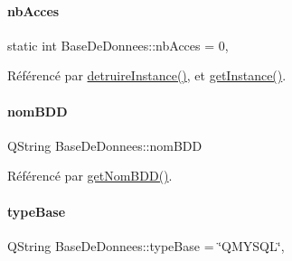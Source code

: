 \mbox{\label{class_base_de_donnees_a5d2e5264c826c6600fd20a9831fd1782}} 
\paragraph{\texorpdfstring{nb\+Acces}{nbAcces}}
{\footnotesize\ttfamily static int Base\+De\+Donnees\+::nb\+Acces = 0\hspace{0.3cm}{\ttfamily [static]}, {\ttfamily [private]}}



Référencé par \hyperlink{class_base_de_donnees_a457401c0816b888c77ce915997545f4e}{detruire\+Instance()}, et \hyperlink{class_base_de_donnees_a80028aa2b6b4fbf30fb2e36357b7d3d3}{get\+Instance()}.

\mbox{\label{class_base_de_donnees_a67c1d973c267a8f5fd6d7461550faa11}} 
\paragraph{\texorpdfstring{nom\+B\+DD}{nomBDD}}
{\footnotesize\ttfamily Q\+String Base\+De\+Donnees\+::nom\+B\+DD\hspace{0.3cm}{\ttfamily [private]}}



Référencé par \hyperlink{class_base_de_donnees_a467909531ae3cdebaf173f6e97cdc624}{get\+Nom\+B\+D\+D()}.

\mbox{\label{class_base_de_donnees_ab682b82167f494496a6531bfe522b42b}} 
\paragraph{\texorpdfstring{type\+Base}{typeBase}}
{\footnotesize\ttfamily Q\+String Base\+De\+Donnees\+::type\+Base = \char`\"{}Q\+M\+Y\+S\+QL\char`\"{}\hspace{0.3cm}{\ttfamily [static]}, {\ttfamily [private]}}



